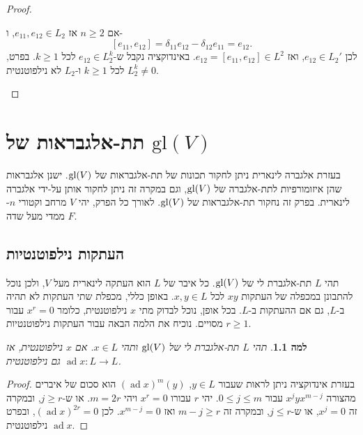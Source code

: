 \documentclass{report}
\theoremstyle{break}
\newtheorem{lemma}[lemma]{למה}
\theoremstyle{MyNonumberbreak}
\newtheorem{proof}{הוכחה}
\DeclareMathOperator{\ad}{ad} %
\begin{document}
\begin{proof}
\begin{enumerate}
		אם $n \ge 2$ אז	$e_{11}, e_{12} \in L_2$, ו-
		\[ [e_{11}, e_{12}] = \delta_{11}e_{12} - \delta_{12}e_{11} = e_{12}. \]
		לכן $e_{12} \in L_2'$, ואז $e_{12} = [e_{11}, e_{12}] \in L^2$. באינדוקציה נקבל ש-$e_{12} \in L_2^k$ לכל $k \ge 1$. בפרט, $L_2^k \neq 0$ לכל $k \ge 1$ ו-$L_2$ לא נילפוטנטית.
	\end{enumerate}
\end{proof}


\chapter{תת-אלגבראות של $\mathrm{gl}(V)$}
בעזרת אלגברה לינארית ניתן לחקור תכונות של תת-אלגבראות של $\operatorname{gl}(V)$. ישנן אלגבראות שהן איזומורפיות לתת-אלגברה של $\operatorname{gl}(V)$, וגם במקרה זה ניתן לחקור אותן על-ידי אלגברה לינארית. בפרק זה נחקור תת-אלגבראות של $\operatorname{gl}(V)$. לאורך כל הפרק, יהי $V$ מרחב וקטורי $n$-ממדי מעל שדה $F$.

\section{העתקות נילפוטנטיות}
תהי $L$ תת-אלגברת לי של $\operatorname{gl}(V)$. כל איבר של $L$ הוא העתקה לינארית מעל $V$, ולכן נוכל להתבונן במכפלה של העתקות $xy$ לכל $x, y \in L$. באופן כללי, מכפלת שתי העתקות לא תהיה ב-$L$, גם אם ההעתקות ב-$L$. בכל אופן, נוכל לבדוק מתי $x$ נילפוטנטית, כלומר $x^r = 0$ עבור $r \ge 1$ מסויים. נוכיח את הלמה הבאה עבור העתקות נילפוטנטיות.
\begin{lemma} \label{lemma:adjoint-nilpotent}
	תהי $L$ תת-אלגברת לי של $\operatorname{gl}(V)$ ותהי $x \in L$. אם $x$ נילפוטנטית, אז $\ad x : L \to L$ גם נילפוטנטית.
\end{lemma}
\begin{proof}
	בעזרת אינדוקציה ניתן לראות שעבור $y \in L$, $(\ad x)^m(y)$ הוא סכום של איברים מהצורה $x^jyx^{m-j}$ עבור $0 \le j \le m$. יהי $r$ עבורו $x^r = 0$ ויהי $m = 2r$. או ש-$j \ge r$, ובמקרה זה $x^j = 0$, או ש-$j \le r$, ובמקרה זה $m - j \ge r$ ואז $x^{m-j} = 0$. לכן $(\ad x)^{2r} = 0$, ובפרט $\ad x$ נילפוטנטית.
\end{proof}
\end{document}
